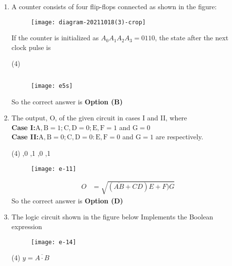 \begin{enumerate}
	\item A counter consists of four flip-flops connected as shown in the figure:\\
	\begin{figure}[H]
		\centering
		\texttt{[image: diagram-20211018(3)-crop]}
	\end{figure}
	If the counter is initialized as $A_{0} A_{1} A_{2} A_{3}=0110$, the state after the next clock pulse is
	{}
\begin{tasks}(4)
\end{tasks}
\begin{answer}$\left. \right. $
\begin{figure}[H]
	\centering
	\texttt{[image: e5s]}
\end{figure}
So the correct answer is \textbf{Option (B)}
\end{answer}
	\item The output, $\mathrm{O}$, of the given circuit in cases I and II, where\\
	\textbf{Case I:}\quad $\mathrm{A}, \mathrm{B}=1 ; \mathrm{C}, \mathrm{D}=0 ; \mathrm{E}, \mathrm{F}=1$ and $\mathrm{G}=0$\\
	\textbf{Case II:}\quad $\mathrm{A}, \mathrm{B}=0 ; \mathrm{C}, \mathrm{D}=0: \mathrm{E}, \mathrm{F}=0$ and $\mathrm{G}=1$ are respectively.
	{}
\begin{tasks}(4)
	,0
	,1
	,0
	,1
\end{tasks}
\begin{figure}[H]
	\centering
	\texttt{[image: e-11]}
\end{figure}
\begin{answer}
\begin{align*}
O&=\sqrt{(\overline{A B}+C D) E+F) G}
\end{align*}
So the correct answer is \textbf{Option (D)}
\end{answer}
	\item  The logic circuit shown in the figure below Implements the Boolean expression
	{}
\begin{figure}[H]
\centering
\texttt{[image: e-14]}
\end{figure}
\begin{tasks}(4)
\task[\textbf{A.}] $y=\overline{A \cdot B}$

\end{tasks}
\end{enumerate}
